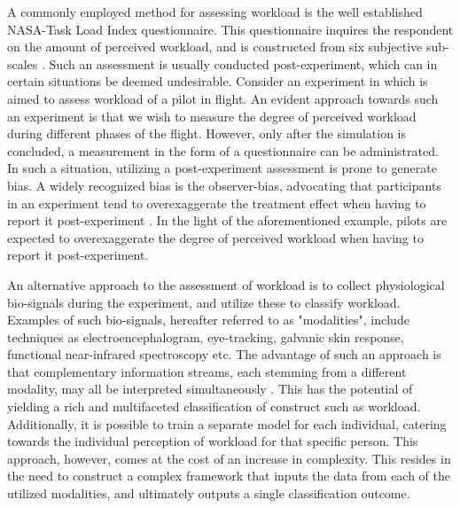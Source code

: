 \documentclass[12pt]{article}
\begin{document}
A commonly employed method for assessing workload is the well established NASA-Task Load Index questionnaire. This questionnaire inquires the respondent on the amount of perceived workload, and is constructed from six subjective sub-scales \cite{hart2006nasa}. Such an assessment is usually conducted post-experiment, which can in certain situations be deemed undesirable. Consider an experiment in which is aimed to assess workload of a pilot in flight. An evident approach towards such an experiment is that we wish to measure the degree of perceived workload during different phases of the flight. However, only after the simulation is concluded, a measurement in the form of a questionnaire can be administrated. In such a situation, utilizing a post-experiment assessment is prone to generate bias. A widely recognized bias is the observer-bias, advocating that participants in an experiment tend to overexaggerate the treatment effect when having to report it post-experiment \cite{mahtani2018catalogue}. In the light of the aforementioned example, pilots are expected to overexaggerate the degree of perceived workload when having to report it post-experiment.

An alternative approach to the assessment of workload is to collect physiological bio-signals during the experiment, and utilize these to classify workload. Examples of such bio-signals, hereafter referred to as "modalities", include techniques as electroencephalogram, eye-tracking, galvanic skin response, functional near-infrared spectroscopy etc. The advantage of such an approach is that complementary information streams, each stemming from a different modality, may all be interpreted simultaneously \cite{ramachandram2017deep}. This has the potential of yielding a rich and multifaceted classification of construct such as workload. Additionally, it is possible to train a separate model for each individual, catering towards the individual perception of workload for that specific person. This approach, however, comes at the cost of an increase in complexity. This resides in the need to construct a complex framework that inputs the data from each of the utilized modalities, and ultimately outputs a single classification outcome. 
\end{document}
